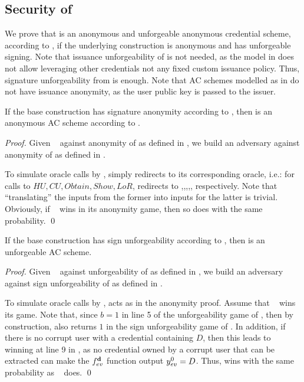 \subsection{Security of \CUASAC}

We prove that \CUASAC is an anonymous and unforgeable anonymous credential
scheme, according to \cite{fhs19}, if the underlying \CUASGen construction
is anonymous and has unforgeable signing. Note that issuance unforgeability
of \CUASGen is not needed, as the model in \cite{fhs19} does not allow
leveraging other credentials not any fixed custom issuance policy. Thus,
signature unforgeability from \UAS is enough. Note that AC schemes modelled
as in \cite{fhs19} do not have issuance anonymity, as the user public key
is passed to the issuer.

\begin{theorem}
  \label{thm:anon-cuasac}
  If the base \CUASGen construction has signature anonymity according to
  , then \CUASAC is an anonymous AC scheme
  according to \cite{fhs19}.
\end{theorem}

\begin{proof}
  Given \adv~ against anonymity of \CUASAC as defined in \cite{fhs19}, we build
  an adversary \advB against anonymity of \CUASGen as defined in
  .

  To simulate oracle calls by \adv, \advB simply redirects to its corresponding
  oracle, i.e.: for calls to $HU,CU,Obtain,Show,LoR$, \advB redirects to
  \HUGEN,\CUGEN,\OBTAIN,\SIGN,\CHALb, respectively. Note that ``translating''
  the inputs from the former into inputs for the latter is trivial.
  Obviously, if \adv~ wins in its anonymity game, then so does \advB with the
  same probability.
  \qed
\end{proof}

\begin{theorem}
  \label{thm:forge-cuasac}
  If the base \CUASGen construction has sign unforgeability according to
  , then \CUASAC is an unforgeable AC scheme.
\end{theorem}

\begin{proof}
  Given \adv~ against unforgeability of \CUASAC as defined in \cite{fhs19}, we
  build an adversary \advB against sign unforgeability of \CUASGen as defined in
  .

  To simulate oracle calls by \adv, \advB acts as in the anonymity proof. Assume
  that \adv~ wins its game. Note that, since $b=1$ in line 5 of the
  unforgeability game of , then by construction, \Verify
  also returns $1$ in the sign unforgeability game of \UAS. In addition, if
  there is no corrupt user with a credential containing $D$, then this leads to
  \advB winning at line 9 in , as no credential
  owned by a corrupt user that can be extracted can make the $f_{ev}^{\mathbf{d}}$
  function output $y_{ev}^0=D$. Thus, \advB wins with the same probability as
  \adv~ does.  
  \qed
\end{proof}


